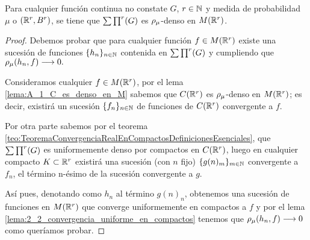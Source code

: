 %

\begin{teorema}\label{teo:2_2_denso_funcion_continua}
    Para cualquier función continua no constate $G$, $r \in \mathbb{N}$ y
    medida de probabilidad $\mu$ o $(\mathbb{R}^r, B^r)$, 
    se tiene que $\sum \prod^r (G)$ es $\rho_{\mu}$-denso en $M(\mathbb{R}^r)$. 
\end{teorema} 
\begin{proof}
    Debemos probar que para cualquier función $f \in M(\mathbb{R}^r)$ existe una 
    sucesión de funciones $\{h_n\}_{n\in \mathbb{N}}$ contenida en $\sum \prod^r (G)$ y 
    cumpliendo que $\rho_{\mu}(h_n, f) \longrightarrow 0.$

    Consideramos cualquier $f \in M(\mathbb{R}^r)$,
    por el lema \ref{lema:A_1_C_es_denso_en_M} sabemos que $C(\mathbb{R}^r)$ es $\rho_{\mu}$-denso en $M(\mathbb{R}^r)$; 
    es decir, existirá un sucesión $\{f_n\}_{n\in \mathbb{N}}$ de funciones de $C(\mathbb{R}^r)$ convergente a 
    $f$.  
    
    Por otra parte sabemos por el teorema \ref{teo:TeoremaConvergenciaRealEnCompactosDefinicionesEsenciales}, 
    que $\sum \prod^r (G)$ es uniformemente denso por compactos en $C(\mathbb{R}^r)$, luego en cualquier compacto 
    $K \subset \mathbb{R}^r$ existirá una sucesión (con $n$ fijo) $\{g(n)_m \} _{m \in \mathbb{N}}$ convergente 
    a $f_n$, el término n-ésimo de la sucesión convergente a $g$. 

    Así pues, denotando como $h_n$ al término $g(n)_n$, obtenemos una sucesión de funciones 
    en $M(\mathbb{R}^r)$ que converge uniformemente en compactos a $f$ y por el lema \ref{lema:2_2_convergencia_uniforme_en_compactos}
    tenemos que $\rho_{\mu}(h_n, f) \longrightarrow 0$ como queríamos probar.     
\end{proof}

